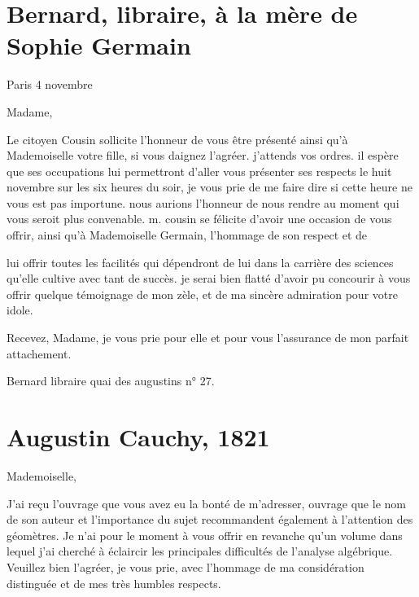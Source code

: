 \documentclass[11pt,a4paper]{article}
\begin{document}
\section{Bernard, libraire, à la mère de Sophie Germain}


Paris 4 novembre

Madame,

Le citoyen Cousin sollicite l'honneur de vous être présenté ainsi qu'à
Mademoiselle votre fille, si vous daignez l'agréer. j'attends vos ordres. il
espère que ses occupations lui permettront d'aller vous présenter ses respects
le huit novembre sur les six heures du soir, je vous prie de me faire dire si
cette heure ne vous est pas importune. nous aurions l'honneur de nous rendre
au moment qui vous seroit plus convenable. m. cousin se félicite d'avoir une
occasion de vous offrir, ainsi qu'à Mademoiselle Germain, l'hommage de son
respect et de


lui offrir toutes les facilités qui dépendront de lui dans la carrière des
sciences qu'elle cultive avec tant de succès. je serai bien flatté d'avoir pu
concourir à vous offrir quelque témoignage de mon zèle, et de ma sincère
admiration pour votre idole.

Recevez, Madame, je vous prie pour elle et pour vous l'assurance de mon
parfait attachement.

Bernard libraire quai des augustins n° 27.

\section{Augustin Cauchy, 1821}


Mademoiselle,

J'ai reçu l'ouvrage que vous avez eu la bonté de m'adresser, ouvrage que le
nom de son auteur et l'importance du sujet recommandent également à
l'attention des géomètres. Je n'ai pour le moment à vous offrir en revanche
qu'un volume dans lequel j'ai cherché à éclaircir les principales difficultés
de l'analyse algébrique. Veuillez bien l'agréer, je vous prie, avec l'hommage
de ma considération distinguée et de mes très humbles respects.
\end{document}
